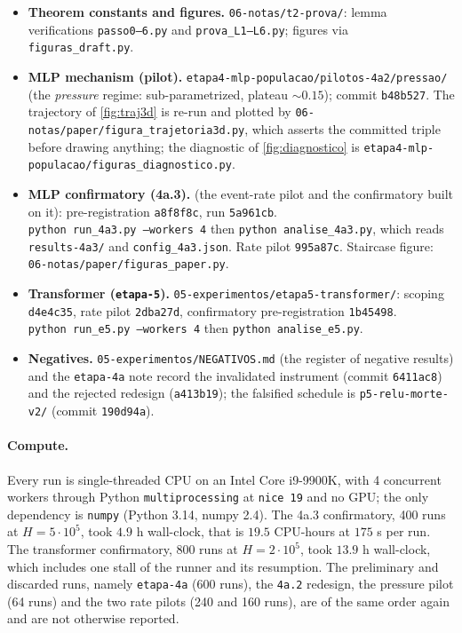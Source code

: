 \documentclass[11pt]{article}
\theoremstyle{definition}
\theoremstyle{remark}
\begin{document}
{\sloppy
\begin{itemize}
\item \textbf{Theorem constants and figures.} \texttt{06-notas/t2-prova/}: lemma
verifications \texttt{passo0--6.py} and \texttt{prova\_L1--L6.py}; figures via
\texttt{figuras\_draft.py}.
\item \textbf{MLP mechanism (pilot).}
\texttt{etapa4-mlp-populacao/pilotos-4a2/pressao/} (the \emph{pressure} regime:
sub-parametrized, plateau $\sim0.15$); commit \texttt{b48b527}. The trajectory of
\cref{fig:traj3d} is re-run and plotted by
\texttt{06-notas/paper/figura\_trajetoria3d.py}, which asserts the committed
triple before drawing anything; the diagnostic of \cref{fig:diagnostico} is
\texttt{etapa4-mlp-populacao/figuras\_diagnostico.py}.
\item \textbf{MLP confirmatory (4a.3).}  (the
event-rate pilot and the confirmatory built on it): pre-registration
\texttt{a8f8f8c}, run \texttt{5a961cb}.\\
\texttt{python run\_4a3.py --workers 4} then \texttt{python analise\_4a3.py},
which reads \texttt{results-4a3/} and \texttt{config\_4a3.json}. Rate pilot
\texttt{995a87c}. Staircase figure: \texttt{06-notas/paper/figuras\_paper.py}.
\item \textbf{Transformer (\texttt{etapa-5}).} \texttt{05-experimentos/etapa5-transformer/}:
scoping \texttt{d4e4c35}, rate pilot \texttt{2dba27d}, confirmatory
pre-registration \texttt{1b45498}. \\
\texttt{python run\_e5.py --workers 4} then \texttt{python analise\_e5.py}.
\item \textbf{Negatives.} \texttt{05-experimentos/NEGATIVOS.md} (the register of
negative results) and the \texttt{etapa-4a} note record the invalidated instrument
(commit \texttt{6411ac8}) and the rejected redesign (\texttt{a413b19}); the
falsified schedule is \texttt{p5-relu-morte-v2/} (commit \texttt{190d94a}).
\end{itemize}
\par}

\paragraph{Compute.}
Every run is single-threaded CPU on an Intel Core i9-9900K, with 4 concurrent
workers through Python \texttt{multiprocessing} at \texttt{nice 19} and no GPU;
the only dependency is \texttt{numpy} (Python 3.14, numpy 2.4). The 4a.3
confirmatory, 400 runs at $H=5\cdot10^{5}$, took $4.9$ h wall-clock, that is
$19.5$ CPU-hours at $175$ s per run. The transformer confirmatory, 800 runs at
$H=2\cdot10^{5}$, took $13.9$ h wall-clock, which includes one stall of the
runner and its resumption. The preliminary and discarded
runs, namely \texttt{etapa-4a} (600 runs), the \texttt{4a.2} redesign, the pressure pilot (64
runs) and the two rate pilots (240 and 160 runs), are of the same order again and
are not otherwise reported.
\end{document}
